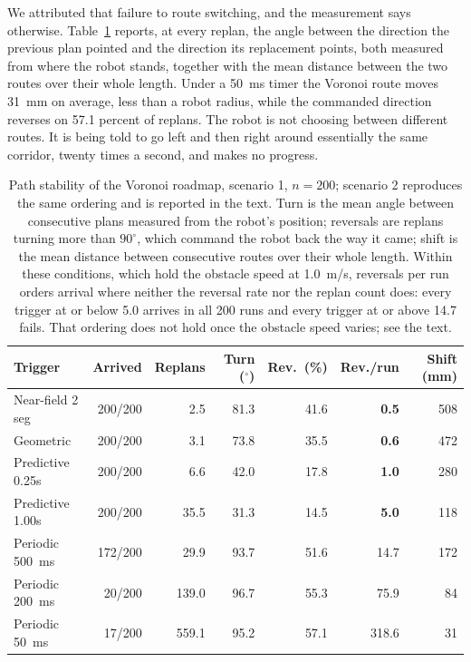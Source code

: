 We attributed that failure to route switching, and the measurement says
otherwise. Table~\ref{tab:stability} reports, at every replan, the angle between
the direction the previous plan pointed and the direction its replacement
points, both measured from where the robot stands, together with the mean
distance between the two routes over their whole length. Under a 50~ms timer the
Voronoi route moves 31~mm on average, less than a robot radius, while the
commanded direction reverses on 57.1 percent of replans. The robot is not
choosing between different routes. It is being told to go left and then right
around essentially the same corridor, twenty times a second, and makes no
progress.
\begin{table}[t]
\centering
\small
\begin{tabular}{lrrrrrr}
\hline
Trigger & Arrived & Replans & Turn ($^\circ$) & Rev.\ (\%) & Rev./run & Shift (mm) \\
\hline
Near-field 2 seg & 200/200 &   2.5 & 81.3 & 41.6 & \textbf{0.5} & 508 \\
Geometric        & 200/200 &   3.1 & 73.8 & 35.5 & \textbf{0.6} & 472 \\
Predictive 0.25s & 200/200 &   6.6 & 42.0 & 17.8 & \textbf{1.0} & 280 \\
Predictive 1.00s & 200/200 &  35.5 & 31.3 & 14.5 & \textbf{5.0} & 118 \\
Periodic 500~ms  & 172/200 &  29.9 & 93.7 & 51.6 & 14.7 & 172 \\
Periodic 200~ms  &  20/200 & 139.0 & 96.7 & 55.3 & 75.9 &  84 \\
Periodic 50~ms   &  17/200 & 559.1 & 95.2 & 57.1 & 318.6 &  31 \\
\hline
\end{tabular}
\caption{Path stability of the Voronoi roadmap, scenario 1, $n=200$; scenario 2
reproduces the same ordering and is reported in the text. Turn is the
mean angle between consecutive plans measured from the robot's position;
reversals are replans turning more than $90^\circ$, which command the robot back
the way it came; shift is the mean distance between consecutive routes over
their whole length. Within these conditions, which hold the obstacle speed at
1.0~m/s, reversals per run orders arrival where neither the reversal rate nor
the replan count does: every trigger at or below 5.0 arrives in all 200 runs
and every trigger at or above 14.7 fails. That ordering does not hold once the
obstacle speed varies; see the text.}
\label{tab:stability}
\end{table}

